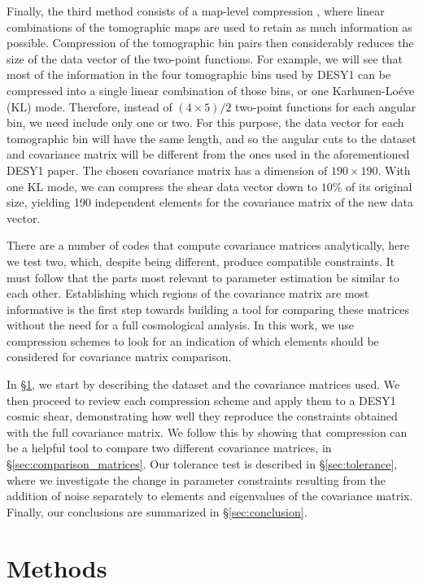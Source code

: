 \documentclass[twocolumn,nofootinbib]{\docclass}
\newcommand{\rsec}[1]{\S\ref{sec:#1}}
\begin{document}
Finally, the third method consists of a map-level compression \cite{Alonso:2017hhj}, where linear combinations of the tomographic maps are used to retain as much information as possible. Compression of the tomographic bin pairs then considerably reduces the size of the data vector of the two-point functions. For example, we will see that most of the information in the four tomographic bins used by DESY1 can be compressed into a single linear combination of those bins, or one Karhunen-Lo\'eve (KL) mode. Therefore, instead of $(4\times5)/2$ two-point functions for each angular bin, we need include only one or two. For this purpose, the data vector for each tomographic bin will have the same length, and so the angular cuts to the dataset and covariance matrix will be different from the ones used in the aforementioned DESY1 paper. The chosen covariance matrix has a dimension of $190 \times 190$. With one KL mode, we can compress the shear data vector down to $10\%$ of its original size, yielding 190 independent elements for the covariance matrix of the new data vector.

There are a number of codes that compute covariance matrices analytically, here we test two, which, despite being different, produce compatible constraints. It must follow that the parts most relevant to parameter estimation be similar to each other. Establishing which regions of the covariance matrix are most informative is the first step towards building a tool for comparing these matrices without the need for a full cosmological analysis. In this work, we use compression schemes to look for an indication of which elements should be considered for covariance matrix comparison.

In \rsec{methods}, we start by describing the dataset and the covariance matrices used. We then proceed to review each compression scheme and apply them to a DESY1 cosmic shear, demonstrating how well they reproduce the constraints obtained with the full covariance matrix. We follow this by showing that compression can be a helpful tool to compare two different covariance matrices, in \rsec{comparison_matrices}. Our tolerance test is described in \rsec{tolerance}, where we investigate the change in parameter constraints resulting from the addition of noise separately to elements and eigenvalues of the covariance matrix. Finally, our conclusions are summarized in \rsec{conclusion}. 

\section{Methods}
\label{sec:methods}
\end{document}
